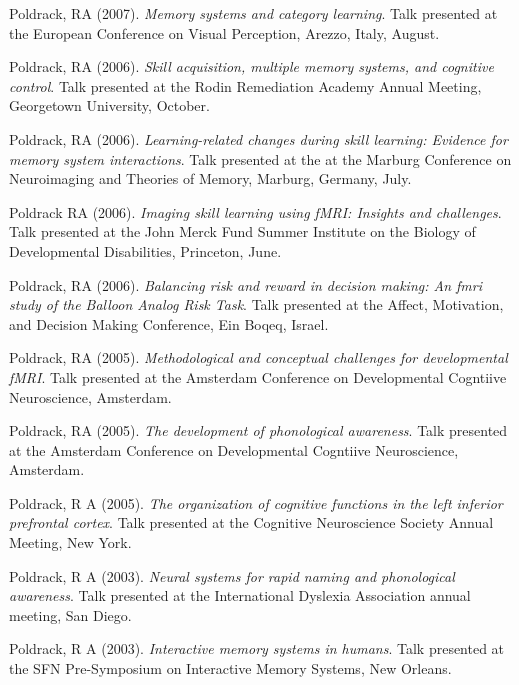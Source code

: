 Poldrack, RA (2007). \emph{Memory systems and category learning}. Talk presented at the European Conference on Visual Perception, Arezzo, Italy, August. \vspace{2mm} 

Poldrack, RA (2006). \emph{Skill acquisition, multiple memory systems, and cognitive control}. Talk presented at the Rodin Remediation Academy Annual Meeting, Georgetown University, October. \vspace{2mm} 

Poldrack, RA (2006). \emph{Learning-related changes during skill learning: Evidence for memory system interactions}. Talk presented at the at the Marburg Conference on Neuroimaging and  Theories of Memory, Marburg, Germany,  July. \vspace{2mm} 

Poldrack RA (2006). \emph{Imaging skill learning using fMRI: Insights and challenges}. Talk presented at the John Merck Fund Summer Institute on the Biology of Developmental Disabilities, Princeton, June. \vspace{2mm} 

Poldrack, RA (2006). \emph{Balancing risk and reward in decision making: An fmri study of the Balloon Analog Risk Task}. Talk presented at the Affect, Motivation, and Decision Making Conference, Ein Boqeq, Israel. \vspace{2mm} 

Poldrack, RA (2005). \emph{Methodological and conceptual challenges for developmental fMRI}. Talk presented at the Amsterdam Conference on Developmental Cogntiive Neuroscience, Amsterdam. \vspace{2mm} 

Poldrack, RA (2005). \emph{The development of phonological awareness}. Talk presented at the Amsterdam Conference on Developmental Cogntiive Neuroscience, Amsterdam. \vspace{2mm} 

Poldrack, R A (2005). \emph{The organization of cognitive functions in the left inferior prefrontal cortex}. Talk presented at the Cognitive Neuroscience Society Annual Meeting, New York. \vspace{2mm} 

Poldrack, R A (2003). \emph{Neural systems for rapid naming and phonological awareness}. Talk presented at the International Dyslexia Association annual meeting, San Diego. \vspace{2mm} 

Poldrack, R A (2003). \emph{Interactive memory systems in humans}. Talk presented at the SFN Pre-Symposium on Interactive Memory Systems, New Orleans. \vspace{2mm} 

